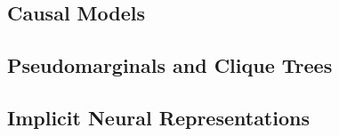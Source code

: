 \subsection{Causal Models}
    \label{ssec:capture-causal-models}


\subsection{Pseudomarginals and Clique Trees}

\subsection{Implicit Neural Representations}
